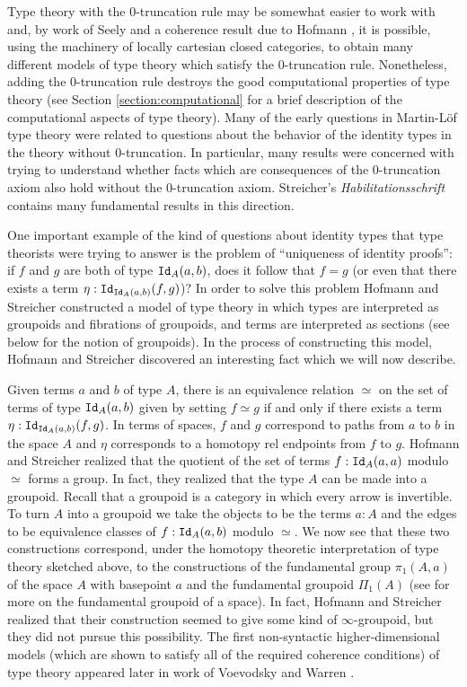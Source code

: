 \documentclass[11pt]{amsart}
\newcommand{\id}[1]{\textnormal{\texttt{Id}}_{#1}}
\theoremstyle{definition}
\theoremstyle{remark}
\numberwithin{equation}{section}
\begin{document}
Type theory with the 0-truncation rule may
be somewhat easier to work with and, by work of Seely
\cite{Seely:1984jw} and a coherence result due to Hofmann \cite{Hofmann:1995be}, it is
possible, using the machinery of locally cartesian closed categories,
to obtain many different models of type theory which satisfy the
0-truncation rule.  Nonetheless, adding the 0-truncation rule destroys
the good computational properties of type theory (see Section
\ref{section:computational} for a brief description of the
computational aspects of type theory).  Many of the early questions in
Martin-L\"{o}f type theory were related to questions about the
behavior of the identity types in the theory without 0-truncation.  In
particular, many results were concerned with trying to understand
whether facts which are consequences of the 0-truncation axiom also
hold without the 0-truncation axiom.  Streicher's
\emph{Habilitationsschrift} \cite{Streicher:vg} contains many fundamental results in this
direction.

One important example of the kind of questions about identity types
that type theorists were trying to answer is the problem of
``uniqueness of identity proofs'': if $f$ and $g$ are both of type
$\id{A}(a,b)$, does it follow that $f=g$ (or even that there exists a
term $\eta:\id{\id{A}(a,b)}(f,g)$)?  In order to solve this problem
Hofmann and Streicher \cite{Hofmann:1998ty} constructed a model of
type theory in which types are interpreted as groupoids and fibrations
of groupoids, and terms are interpreted as sections (see below for the
notion of groupoids).  In the process of
constructing this model, Hofmann and Streicher discovered an
interesting fact which we will now describe.

Given terms $a$ and $b$ of type $A$, there is an equivalence relation
$\simeq$ on the set of terms of type $\id{A}(a,b)$ given by setting
$f\simeq g$ if and only if there exists a term
$\eta:\id{\id{A}(a,b)}(f,g)$.  In terms of spaces, $f$ and $g$
correspond to paths from $a$ to $b$ in the space $A$ and $\eta$
corresponds to a homotopy rel endpoints from $f$ to $g$.  Hofmann and
Streicher realized that the quotient of the set
of terms $f:\id{A}(a,a)$ modulo $\simeq$ forms a group.  In fact, they
realized that the type $A$ can be made into a groupoid.  Recall that a
groupoid is a category in which every arrow is invertible.  To turn
$A$ into a groupoid we take the objects to be the terms $a:A$ and the
edges to be equivalence classes of $f:\id{A}(a,b)$ modulo $\simeq$.
We now see that these two constructions correspond, under the homotopy
theoretic interpretation of type theory sketched above, to the
constructions of the fundamental group $\pi_{1}(A,a)$ of the space $A$
with basepoint $a$ and the fundamental groupoid $\Pi_{1}(A)$ (see
\cite{Brown:2006tj} for more on the fundamental groupoid of a space).
In fact, Hofmann and Streicher realized that their construction seemed to give
some kind of $\infty$-groupoid, but they did not pursue
this possibility.  The first non-syntactic higher-dimensional models (which
are shown to satisfy all of the required coherence conditions) of type theory
appeared later in work of Voevodsky \cite{Voevodsky:2009,Kapulkin:USS} and Warren
\cite{Warren:2008ts,Warren:2011tn}.
\end{document}
